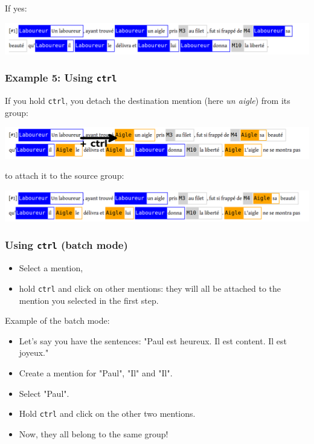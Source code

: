 \documentclass[12pt]{article}
\begin{document}
If yes:\nopagebreak

\includegraphics[width=17cm]{imgs/dd_example_03_after.png}

 \subsubsection{Example 5: Using \texttt{ctrl}}

If you hold \verb|ctrl|, you detach the destination mention (here \emph{un
aigle}) from its group:\nopagebreak

\includegraphics[width=17cm]{imgs/dd_example_04_before.png}

to attach it to the source group:\nopagebreak

\includegraphics[width=17cm]{imgs/dd_example_04_after.png}

 \subsubsection{Using \texttt{ctrl} (batch mode)}

\begin{itemize}
   \item Select a mention,
   \item hold \verb|ctrl| and click on other mentions: they will all be
   attached to the mention you selected in the first step.
\end{itemize}

Example of the batch mode:
\begin{itemize}
   \item Let's say you have the sentences: "Paul est heureux.  Il est
   content. Il est joyeux."
   \item Create a mention for "Paul", "Il" and "Il".
   \item Select "Paul".
   \item Hold \verb|ctrl| and click on the other two mentions.
   \item Now, they all belong to the same group!
\end{itemize}
\end{document}
